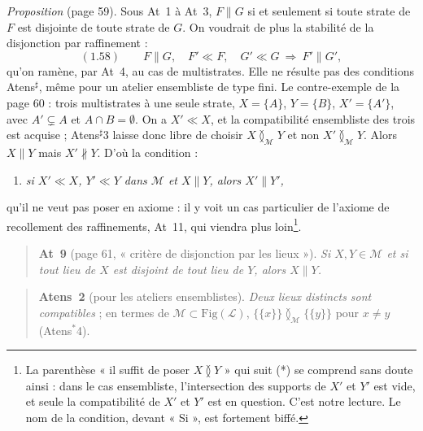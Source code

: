 \documentclass[11pt,a4paper]{article}
\begin{document}
\emph{Proposition} (page 59). Sous At~1 à At~3, $F \parallel G$ si et seulement
si toute strate de $F$ est disjointe de toute strate de $G$. On voudrait de plus
la stabilité de la disjonction par raffinement :
\[
(1.58) \qquad F \parallel G, \quad F' \ll F, \quad G' \ll G \ \Longrightarrow\ F'
\parallel G' ,
\]
qu'on ramène, par At~4, au cas de multistrates. Elle ne résulte pas des
conditions Atens$^{\sharp}$, même pour un atelier ensembliste de type fini. Le
contre-exemple de la page 60 : trois multistrates à une seule strate, $X =
\lbrace A \rbrace$, $Y = \lbrace B \rbrace$, $X' = \lbrace A' \rbrace$, avec $A'
\subsetneq A$ et $A \cap B = \emptyset$. On a $X' \ll X$, et la compatibilité
ensembliste des trois est acquise ; Atens$^{\sharp}$3 laisse donc libre de choisir
$X \between_{\mathcal{M}} Y$ et non $X' \between_{\mathcal{M}} Y$. Alors $X
\parallel Y$ mais $X' \nparallel Y$. D'où la condition :
\begin{enumerate}
\item[(*)] \emph{si $X' \ll X$, $Y' \ll Y$ dans $\mathcal{M}$ et $X \parallel Y$,
alors $X' \parallel Y'$,}
\end{enumerate}
qu'il ne veut pas poser en axiome : il y voit un cas particulier de l'axiome de
recollement des raffinements, At~11, qui viendra plus loin\footnote{La
parenthèse « il suffit de poser $X \between Y$ » qui suit (*) se comprend sans
doute ainsi : dans le cas ensembliste, l'intersection des supports de $X'$ et
$Y'$ est vide, et seule la compatibilité de $X'$ et $Y'$ est en question. C'est
notre lecture. Le nom de la condition, devant « Si », est fortement biffé.}.

\begin{quote}
\textbf{At~9} (page 61, « critère de disjonction par les lieux »). \emph{Si $X,
Y \in \mathcal{M}$ et si tout lieu de $X$ est disjoint de tout lieu de $Y$,
alors $X \parallel Y$.}
\end{quote}
\begin{quote}
\textbf{Atens~2} (pour les ateliers ensemblistes). \emph{Deux lieux distincts sont
compatibles} ; en termes de $\mathcal{M} \subset \mathrm{Fig}(\mathcal{L})$,
$\lbrace \lbrace x \rbrace \rbrace \between_{\mathcal{M}} \lbrace \lbrace y
\rbrace \rbrace$ pour $x \neq y$ (Atens$^{*}$4).
\end{quote}
\end{document}
